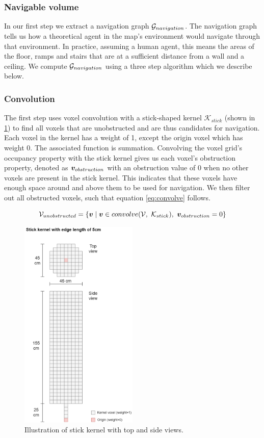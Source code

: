 \subsubsection{Navigable volume}
In our first step we extract a navigation graph \(\mathcal{G}_{navigation}\). The navigation graph tells us how a theoretical agent in the map's environment would navigate through that environment. In practice, assuming a human agent, this means the areas of the floor, ramps and stairs that are at a sufficient distance from a wall and a ceiling. We compute \(\mathcal{G}_{navigation}\) using a three step algorithm which we describe below.

\subsubsection{Convolution}
The first step uses voxel convolution with a stick-shaped kernel \(\mathcal{K}_{stick}\) (shown in \ref{fig:stick_kernel}) to find all voxels that are unobstructed and are thus candidates for navigation. Each voxel in the kernel has a weight of 1, except the origin voxel which has weight 0. The associated function is summation. Convolving the voxel grid's occupancy property with the stick kernel gives us each voxel's obstruction property, denoted as \(\boldsymbol{v}_{obstruction}\) with an obstruction value of 0 when no other voxels are present in the stick kernel. This indicates that these voxels have enough space around and above them to be used for navigation. We then filter out all obstructed voxels, such that equation \ref{eq:convolve} follows.

\begin{equation}
    \label{eq:convolve}
\mathcal{V}_{unobstructed}=\{\boldsymbol{v} \mid \boldsymbol{v} \in convolve(\mathcal{V},\ \mathcal{K}_{stick}),\ \boldsymbol{v}_{obstruction} = 0\}
\end{equation}

\begin{figure}[h]
    \centering
    \includegraphics*[width=0.5\textwidth]{./fig/structuring_element.png}
    \caption{Illustration of stick kernel with top and side views.}
    \label{fig:stick_kernel}
\end{figure}

